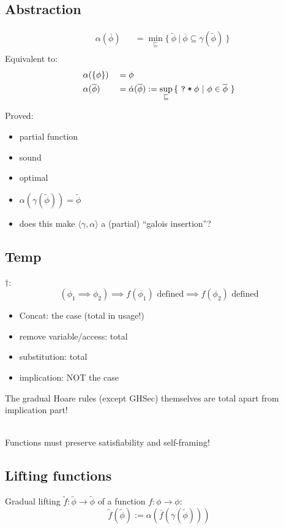 \documentclass[11pt,a4paper]{article}
\newcommand{\grad}[1]{\widetilde{#1}}
\newcommand{\ttt}{\texttt}
\newcommand{\qm}{\ttt{?}}
\newcommand{\withqm}[1]{\ttt{\qm\:*\:$#1$}}
\begin{document}
\newcommand{\dalpha}{\dot{\alpha}}

\subsection{Abstraction}
\begin{align*}
&\alpha(\overline{\phi}) &&= \min_{\sqsubseteq} {\{~ \grad{\phi} ~|~ \overline{\phi} \subseteq \gamma(\grad{\phi}) ~\}}\\
\end{align*}
Equivalent to:
\begin{align*}
&\alpha(\{ \phi \}) &&= \phi\\
&\alpha(\overline{\phi}) &&= \dalpha(\overline{\phi}) := \sup_{\sqsubseteq} {\{~ \withqm{\phi} ~|~ \phi \in \overline{\phi} ~\}}\\
\end{align*}

Proved:
\begin{itemize}
	\item partial function
	\item sound
	\item optimal
	\item $\alpha(\gamma(\grad{\phi})) = \grad{\phi}$
    \item does this make $\langle \gamma, \alpha \rangle$ a (partial) “galois insertion”?
\end{itemize}

\subsection{Temp}
$\dagger$:
$$(\phi_1 \implies \phi_2) \implies f(\phi_1) \text{ defined} \implies f(\phi_2) \text{ defined}$$
\begin{itemize}
	\item Concat: the case (total in usage!)
	\item remove variable/access: total
	\item substitution: total
	\item implication: NOT the case
\end{itemize}
The gradual Hoare rules (except GHSec) themselves are total apart from implication part!

~\\
Functions must preserve satisfiability and self-framing!


\subsection{Lifting functions}
Gradual lifting $\grad{f} : \grad{\phi} \rightarrow \grad{\phi}$ of a function $f : \phi \rightarrow \phi$:
$$\grad{f}(\grad{\phi}) := \alpha(\overline{f}(\gamma(\grad{\phi})))$$ 
\end{document}
